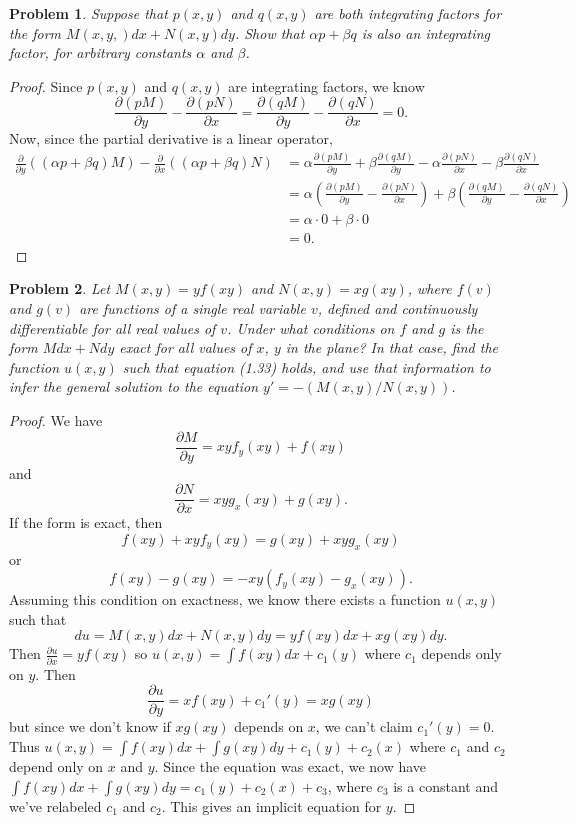 \documentclass{article}
\newtheorem{problem}{Problem}
\begin{document}
\begin{problem}
Suppose that $p(x,y)$ and $q(x,y)$ are both integrating factors for the form $M(x,y,) dx + N(x,y) dy$. Show that $\alpha p + \beta q$ is also an integrating factor, for arbitrary constants $\alpha$ and $\beta$.
\end{problem}
\begin{proof}
Since $p(x,y)$ and $q(x,y)$ are integrating factors, we know
\[
\frac{\partial (pM)}{\partial y} - \frac{\partial (pN)}{\partial x} = \frac{\partial (qM)}{\partial y} - \frac{\partial (qN)}{\partial x} = 0.
\]
Now, since the partial derivative is a linear operator,
\begin{align*}
\frac{\partial}{\partial y} ((\alpha p + \beta q)M) - \frac{\partial}{\partial x} ((\alpha p + \beta q)N)
&= \alpha \frac{\partial (pM)}{\partial y} + \beta \frac{\partial (qM)}{\partial y} - \alpha \frac{\partial (pN)}{\partial x} - \beta \frac{\partial (qN)}{\partial x}\\
&= \alpha \left ( \frac{\partial (pM)}{\partial y} - \frac{\partial (pN)}{\partial x} \right ) + \beta \left ( \frac{\partial (qM)}{\partial y} - \frac{\partial (qN)}{\partial x} \right )\\
&= \alpha \cdot 0 + \beta \cdot 0\\
&= 0.
\end{align*}
\end{proof}

\begin{problem}
Let $M(x,y) = yf(xy)$ and $N(x,y) = xg(xy)$, where $f(v)$ and $g(v)$ are functions of a single real variable $v$, defined and continuously differentiable for all real values of $v$. Under what conditions on $f$ and $g$ is the form $Mdx + Ndy$ exact for all values of $x$, $y$ in the plane? In that case, find the function $u(x,y)$ such that equation (1.33) holds, and use that information to infer the general solution to the equation $y' = -(M(x,y)/N(x,y))$.
\end{problem}
\begin{proof}
We have
\[
\frac{\partial M}{\partial y} = xyf_y(xy) + f(xy)
\]
and
\[
\frac{\partial N}{\partial x} = xyg_x(xy) + g(xy).
\]
If the form is exact, then
\[
f(xy) + xyf_y(xy) = g(xy) + xyg_x(xy)
\]
or
\[
f(xy) - g(xy) = -xy(f_y(xy) - g_x(xy)).
\]
Assuming this condition on exactness, we know there exists a function $u(x,y)$ such that
\[
du = M(x,y)dx + N(x,y)dy = yf(xy)dx + xg(xy)dy.
\]
Then $\frac{\partial u}{\partial x} = y f(xy)$ so $u(x,y) = \int f(xy)dx + c_1(y)$ where $c_1$ depends only on $y$. Then
\[
\frac{\partial u}{\partial y} = xf(xy) + c_1'(y) = xg(xy)
\]
but since we don't know if $xg(xy)$ depends on $x$, we can't claim $c_1'(y) = 0$. Thus $u(x,y) = \int f(xy)dx + \int g(xy)dy + c_1(y) + c_2(x)$ where $c_1$ and $c_2$ depend only on $x$ and $y$. Since the equation was exact, we now have $\int f(xy)dx + \int g(xy)dy = c_1(y) + c_2(x) + c_3$, where $c_3$ is a constant and we've relabeled $c_1$ and $c_2$. This gives an implicit equation for $y$.
\end{proof}
\end{document}
